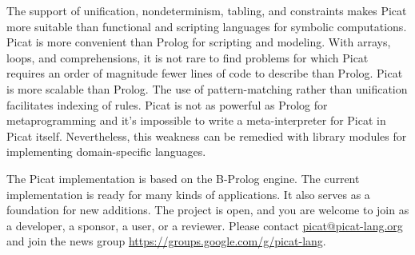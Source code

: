The support of unification, nondeterminism, tabling, and constraints makes Picat more suitable than functional and scripting languages for symbolic computations. Picat is more convenient than Prolog for scripting and modeling. With arrays, loops, and comprehensions, it is not rare to find problems for which Picat requires an order of magnitude fewer lines of code to describe than Prolog. Picat is more scalable than Prolog. The use of pattern-matching rather than unification facilitates indexing of rules. Picat is not as powerful as Prolog for metaprogramming and it's impossible to write a meta-interpreter for Picat in Picat itself. Nevertheless, this weakness can be remedied with library modules for implementing domain-specific languages.

The Picat implementation is based on the B-Prolog engine. The current implementation is ready for many kinds of applications. It also serves as a foundation for new additions. The project is open, and you are welcome to join as a developer, a sponsor, a user, or a reviewer. Please contact \url{picat@picat-lang.org} and join the news group \url{https://groups.google.com/g/picat-lang}.


